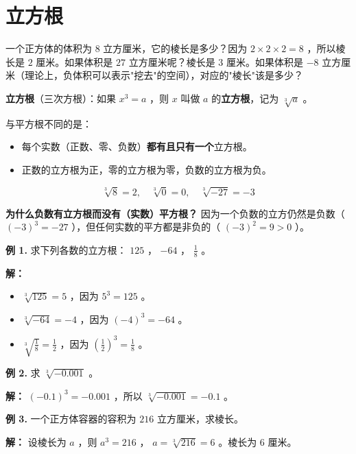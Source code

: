 \section*{立方根}


\begin{explore}


一个正方体的体积为 $8$ 立方厘米，它的棱长是多少？因为 $2 \times 2 \times 2 = 8$ ，所以棱长是 $2$ 厘米。如果体积是 $27$ 立方厘米呢？棱长是 $3$ 厘米。如果体积是 $-8$ 立方厘米（理论上，负体积可以表示"挖去"的空间），对应的"棱长"该是多少？

\end{explore}

\begin{understand}


\textbf{立方根}（三次方根）：如果 $x^3 = a$ ，则 $x$ 叫做 $a$ 的\textbf{立方根}，记为 $\sqrt[3]{a}$ 。

与平方根不同的是：

\begin{itemize}
  \item 每个实数（正数、零、负数）\textbf{都有且只有一个}立方根。
  \item 正数的立方根为正，零的立方根为零，负数的立方根为负。
\end{itemize}


\[
\sqrt[3]{8} = 2, \quad \sqrt[3]{0} = 0, \quad \sqrt[3]{-27} = -3
\]


\textbf{为什么负数有立方根而没有（实数）平方根？} 因为一个负数的立方仍然是负数（ $(-3)^3 = -27$ ），但任何实数的平方都是非负的（ $(-3)^2 = 9 > 0$ ）。

\end{understand}

\begin{workedexamples}


\textbf{例 1.} 求下列各数的立方根： $125$ ， $-64$ ， $\frac{1}{8}$ 。

\textbf{解：}

\begin{itemize}
  \item $\sqrt[3]{125} = 5$ ，因为 $5^3 = 125$ 。
  \item $\sqrt[3]{-64} = -4$ ，因为 $(-4)^3 = -64$ 。
  \item $\sqrt[3]{\frac{1}{8}} = \frac{1}{2}$ ，因为 $\left(\frac{1}{2}\right)^3 = \frac{1}{8}$ 。
\end{itemize}


\textbf{例 2.} 求 $\sqrt[3]{-0.001}$ 。

\textbf{解：} $(-0.1)^3 = -0.001$ ，所以 $\sqrt[3]{-0.001} = -0.1$ 。

\textbf{例 3.} 一个正方体容器的容积为 $216$ 立方厘米，求棱长。

\textbf{解：} 设棱长为 $a$ ，则 $a^3 = 216$ ， $a = \sqrt[3]{216} = 6$ 。棱长为 $6$ 厘米。

\end{workedexamples}

